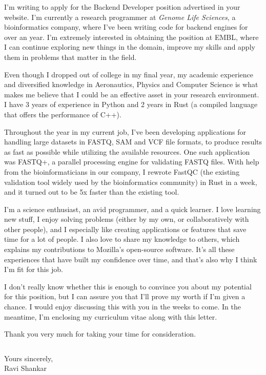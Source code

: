 \documentclass[11pt,a4paper,sans]{moderncv}        %
\begin{document}
\makelettertitle

I'm writing to apply for the Backend Developer position advertised in your website. I'm currently a research programmer at \textit{Genome Life Sciences}, a bioinformatics company, where I've been writing code for backend engines for over an year. I'm extremely interested in obtaining the position at EMBL, where I can continue exploring new things in the domain, improve my skills and apply them in problems that matter in the field.

Even though I dropped out of college in my final year, my academic experience and diversified knowledge in Aeronautics, Physics and Computer Science is what makes me believe that I could be an effective asset in your research environment. I have 3 years of experience in Python and 2 years in Rust (a compiled language that offers the performance of C++).

Throughout the year in my current job, I've been developing applications for handling large datasets in FASTQ, SAM and VCF file formats, to produce results as fast as possible while utilizing the available resources. One such application was FASTQ+, a parallel processing engine for validating FASTQ files. With help from the bioinformaticians in our company, I rewrote FastQC (the existing validation tool widely used by the bioinformatics community) in Rust in a week, and it turned out to be 5x faster than the existing tool.

I'm a science enthusiast, an avid programmer, and a quick learner. I love learning new stuff, I enjoy solving problems (either by my own, or collaboratively with other people), and I especially like creating applications or features that save time for a lot of people. I also love to share my knowledge to others, which explains my contributions to Mozilla's open-source software. It's all these experiences that have built my confidence over time, and that's also why I think I'm fit for this job.

I don't really know whether this is enough to convince you about my potential for this position, but I can assure you that I'll prove my worth if I'm given a chance. I would enjoy discussing this with you in the weeks to come. In the meantime, I'm enclosing my curriculum vitae along with this letter.

Thank you very much for taking your time for consideration.

$\ $

Yours sincerely,
\\
Ravi Shankar

\end{document}
